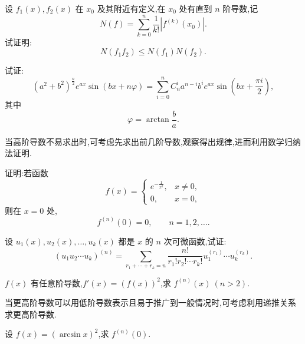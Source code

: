 \documentclass[../数学分析培优讲义.tex]{subfiles}
\begin{document}
\newpage


\begin{example}
设 $f_1(x),f_2(x)$ 在 $x_0$ 及其附近有定义,在 $x_0$ 处有直到 $n$ 阶导数,记
\[
    N(f)=\sum\limits_{k=0}^n\dfrac{1}{k!}|f^{(k)}(x_0)|.
\]
试证明:
\[
    N(f_1f_2)\leq N(f_1)N(f_2).
\]
\end{example}
\exampleblank

\begin{example}
试证:
\[
    (a^2+b^2)^{\frac{n}{2}}e^{ax}\sin(bx+n\varphi)
    =\sum\limits_{i=0}^n C_{n}^{i}a^{n-i}b^i e^{ax}
    \sin\left(bx+\dfrac{\pi i}{2}\right),
\]
其中
\[
    \varphi=\arctan\dfrac{b}{a}.
\]
\end{example}
\exampleblank


\newpage


当高阶导数不易求出时,可考虑先求出前几阶导数,观察得出规律,进而利用数学归纳法证明.

\begin{example}[\markstar]
证明:若函数
\[
f(x)=
\begin{cases}
    e^{-\frac{1}{x^2}}, & x\neq0,\\
    0, & x=0,
\end{cases}
\]
则在 $x=0$ 处,
\[
    f^{(n)}(0)=0,
    \qquad n=1,2,\ldots.
\]
\end{example}
\exampleblank

\begin{example}
设 $u_1(x),u_2(x),\ldots,u_k(x)$ 都是 $x$ 的 $n$ 次可微函数,试证:
\[
    (u_1u_2\cdots u_k)^{(n)}
    =\sum\limits_{r_1+\cdots+r_k=n}
    \dfrac{n!}{r_1!r_2!\cdots r_k!}
    u_1^{(r_1)}\cdots u_k^{(r_k)}.
\]
\end{example}
\exampleblank

\begin{example}[\markstar]
$f(x)$ 有任意阶导数,$f'(x)=(f(x))^2$,求 $f^{(n)}(x)\ (n>2)$.
\end{example}
\exampleblank


\newpage


当更高阶导数可以用低阶导数表示且易于推广到一般情况时,可考虑利用递推关系求更高阶导数.

\begin{example}
设 $f(x)=(\arcsin x)^2$,求 $f^{(n)}(0)$.
\end{example}
\exampleblank
\end{document}
